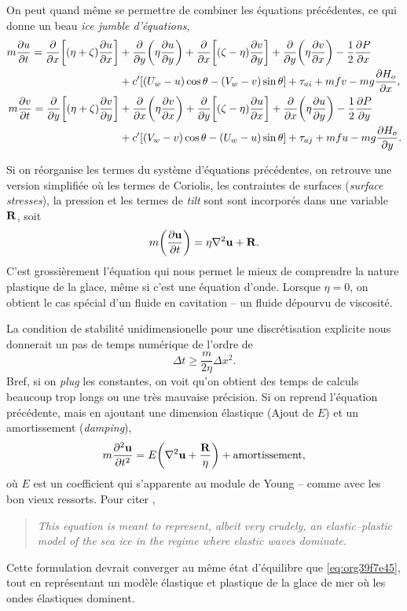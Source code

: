 \documentclass[10pt]{article}
\numberwithin{equation}{section}
\newcommand{\uu}{\vb{u}}
\begin{document}
On peut quand même se permettre de combiner les équations précédentes, ce qui donne un beau \emph{ice jumble d'équations},
\begin{align}
   m \pdv{u}{t} = \pdv{}{x}\qty[(\eta + \zeta)\pdv{u}{x}] &+\pdv{}{y}\qty(\eta\pdv{u}{y}) + \pdv{}{x}\qty[(\zeta-\eta)\pdv{v}{y}] + \pdv{}{y}\qty(\eta \pdv{v}{x}) - \frac{1}{2}\pdv{P}{x}\nonumber\\
     & + c'\qty[\qty(U_w-u)\cos\theta - \qty(V_w-v)\sin\theta] + \tau_{ai} + mfv - mg\pdv{H_o}{x},\\
   m \pdv{v}{t} = \pdv{}{y}\qty[(\eta + \zeta)\pdv{v}{y}] &+\pdv{}{x}\qty(\eta\pdv{v}{x}) + \pdv{}{y}\qty[(\zeta-\eta)\pdv{u}{x}] + \pdv{}{x}\qty(\eta \pdv{u}{y}) - \frac{1}{2}\pdv{P}{y}\nonumber\\
     & + c'\qty[\qty(V_w-v)\cos\theta - \qty(U_w-u)\sin\theta] + \tau_{aj} + mfu - mg\pdv{H_o}{y}.
\end{align}

Si on réorganise les termes du système d'équations précédentes, on retrouve une version simplifiée où les termes de Coriolis, les contraintes de surfaces (\emph{surface stresses}), la pression et les termes de \emph{tilt} sont sont incorporés dans une variable \(\vb{R}\), soit
\begin{equation}
\label{eq:org39f7e45}
   m\qty(\pdv{\uu}{t}) = \eta \laplacian{\uu} + \vb{R}.
\end{equation}
C'est grossièrement l'équation qui nous permet le mieux de comprendre la nature plastique de la glace, même si c'est une équation d'onde. 
Lorsque \(\eta=0\), on obtient le cas spécial d'un fluide en cavitation -- un fluide dépourvu de viscosité.\bigskip

La condition de stabilité unidimensionelle pour une discrétisation explicite nous donnerait un pas de temps numérique de l'ordre de
\begin{equation}
   \Delta t \geq \frac{m}{2\eta} \Delta x^2.
\end{equation}
Bref, si on \emph{plug} les constantes, on voit qu'on obtient des temps de calculs beaucoup trop longs ou une très mauvaise précision.
Si on reprend l'équation précédente, mais en ajoutant une dimension élastique (Ajout de \(E\)) et un amortissement (\emph{damping}),
\begin{equation}
\label{eq:orgddd4d84}
   m \pdv[2]{\uu}{t} =E \qty(\laplacian{\uu} + \frac{\vb{R}}{\eta}) + \text{amortissement},
\end{equation}
où \(E\) est un coefficient qui s'apparente au module de Young -- comme avec les bon vieux ressorts. 
Pour citer \Textcite{hunke1997elastic},
\begin{quote}
\emph{This equation is meant to represent, albeit very crudely, an elastic–plastic model of the sea ice in the regime where elastic waves dominate.}
\end{quote}
Cette formulation devrait converger au même état d'équilibre que \ref{eq:org39f7e45}, tout en représentant un modèle élastique et plastique de la glace de mer où les ondes élastiques dominent.
\end{document}
